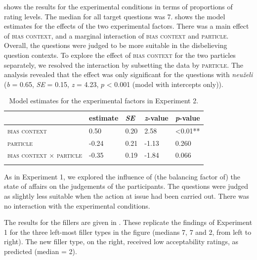 \documentclass[output=paper,colorlinks,citecolor=brown]{langscibook}
\begin{document}
 shows the results for the experimental conditions in terms of proportions of rating levels. The median for all target questions was 7.  shows the model estimates for the effects of the two experimental factors. There was a main effect of \textsc{bias context}, and a marginal interaction of \textsc{bias context} and \textsc{particle}. Overall, the questions were judged to be more suitable in the disbelieving question contexts. To explore the effect of \textsc{bias context} for the two particles separately, we resolved the interaction by subsetting the data by \textsc{particle}. The analysis revealed that the effect was only significant for the questions with \textit{neuželi} (\textit{b} = 0.65, \textit{SE} = 0.15, \textit{z} = 4.23, $p$ < 0.001 (model with intercepts only)).

\begin{table}
\begin{tabularx}{\textwidth}{lYYYl}
\lsptoprule
& estimate & \textit{SE} & \textit{z}-value & \textit{p}-value \\
\midrule
\textsc{bias context} & \phantom{-}0.50 & 0.20 & \phantom{-}2.58 & <0.01** \\
\textsc{particle} & -0.24 & 0.21 & -1.13 & \phantom{<}0.260 \\
\textsc{bias context} $\times$ \textsc{particle} & -0.35 & 0.19 & -1.84 & \phantom{<}0.066 \\
\lspbottomrule
\end{tabularx}
\caption{Model estimates for the experimental factors in Experiment 2.} \label{tab:05:8}
\end{table}

As in Experiment 1, we explored the influence of (the balancing factor of) the state of affairs on the judgements of the participants. The questions were judged as slightly less suitable when the action at issue had been carried out. There was no interaction with the experimental conditions. 

The results for the fillers are given in . These replicate the findings of Experiment 1 for the three left-most filler types in the figure (medians 7, 7 and 2, from left to right). The new filler type, on the right, received low acceptability ratings, as predicted (median = 2). 
\end{document}
